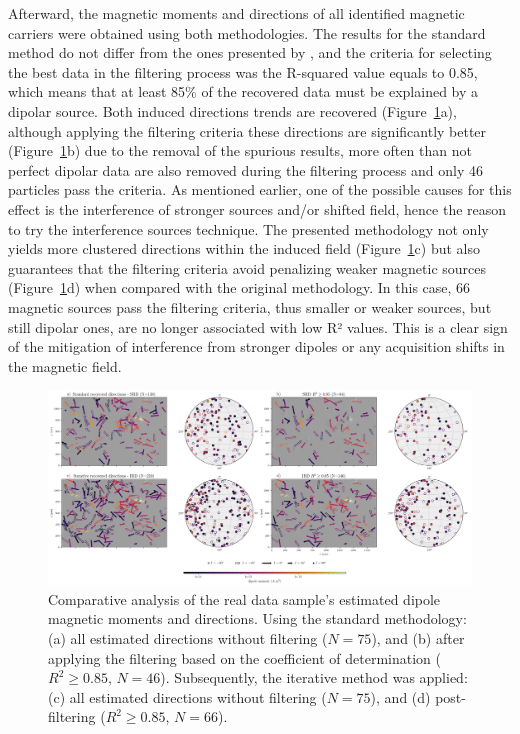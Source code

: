 Afterward, the magnetic moments and directions of all identified magnetic carriers were obtained using both methodologies. The results for the standard method do not differ from the ones presented by \citet{Souza-Junior2023b}, and the criteria for selecting the best data in the filtering process was the R-squared value \citep[similar to the dipolarity parameter,][]{Fu2020} equals to 0.85, which means that at least 85\% of the recovered data must be explained by a dipolar source. Both induced directions trends are recovered (Figure~\ref{real-data-stereograms}a), although applying the filtering criteria these directions are significantly better (Figure~\ref{real-data-stereograms}b) due to the removal of the spurious results, more often than not perfect dipolar data are also removed during the filtering process and only 46 particles pass the criteria. As mentioned earlier, one of the possible causes for this effect is the interference of stronger sources and/or shifted field, hence the reason to try the interference sources technique. The presented methodology not only yields more clustered directions within the induced field (Figure~\ref{real-data-stereograms}c) but also guarantees that the filtering criteria avoid penalizing weaker magnetic sources (Figure~\ref{real-data-stereograms}d) when compared with the original methodology. In this case, 66 magnetic sources pass the filtering criteria, thus smaller or weaker sources, but still dipolar ones, are no longer associated with low R² values. This is a clear sign of the mitigation of interference from stronger dipoles or any acquisition shifts in the magnetic field.  


\begin{figure}[tb!]
  \centering
  \includegraphics[width=1\linewidth]{paper/figures/real-data-stereograms.png}
  \caption{
Comparative analysis of the real data sample's estimated dipole magnetic moments and directions. Using the standard methodology: (a) all estimated directions without filtering ($N = 75$), and (b) after applying the filtering based on the coefficient of determination ($R^2 \geq 0.85$, $N = 46$). Subsequently, the iterative method was applied: (c) all estimated directions without filtering ($N = 75$), and (d) post-filtering ($R^2 \geq 0.85$, $N = 66$).
}
  \label{real-data-stereograms}
\end{figure}
